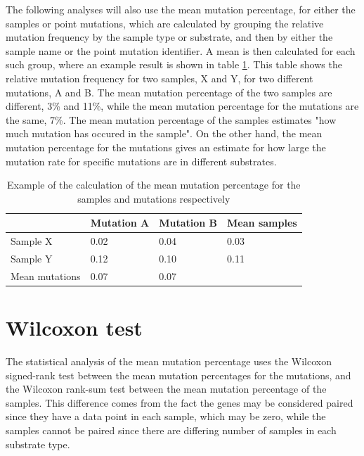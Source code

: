 The following analyses will also use the mean mutation percentage, for either the samples or point mutations, which are calculated by grouping the relative mutation frequency by the sample type or substrate, and then by either the sample name or the point mutation identifier. 
A mean is then calculated for each such group, where an example result is shown in table \ref{example_mean_table}. This table shows the relative mutation frequency for two samples, X and Y, for two different mutations, A and B. 
The mean mutation percentage of the two samples are different, 3\% and 11\%, while the mean mutation percentage for the mutations are the same, 7\%.
The mean mutation percentage of the samples estimates "how much mutation has 
occured in the sample". 
On the other hand, the mean mutation percentage for the mutations gives an estimate for how large the mutation rate for specific mutations are in different substrates.


\begin{table}[h]
    \caption{Example of the calculation of the mean mutation percentage for the samples and mutations respectively}
    \label{example_mean_table}
\begin{tabular}{@{}lll|l@{}}
\toprule
               & Mutation A & Mutation B & Mean samples \\ \midrule
Sample X       & 0.02       & 0.04       & 0.03         \\
Sample Y       & 0.12       & 0.10       & 0.11         \\ \midrule
Mean mutations & 0.07       & 0.07       &              \\ 
\bottomrule 
\end{tabular}
\end{table}

\section{Wilcoxon test}
The statistical analysis of the mean mutation percentage uses the Wilcoxon signed-rank test between the mean mutation percentages for the mutations, and the Wilcoxon rank-sum test between the mean mutation percentage of the samples. 
This difference comes from the fact the genes may be considered paired since they have a data point in each sample, which may be zero, while the samples cannot be paired since there are differing number of samples in each substrate type.

